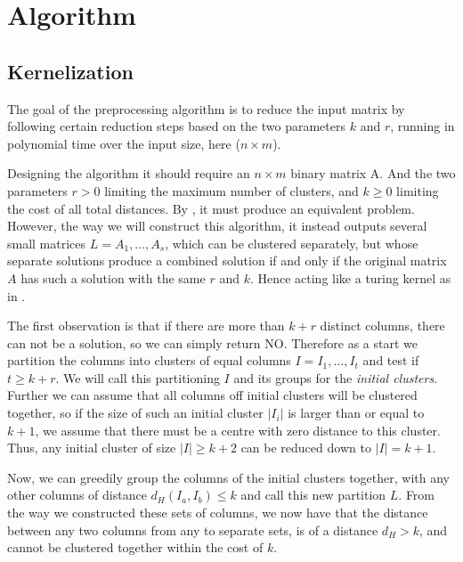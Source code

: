 \documentclass[a4paper]{article}
\begin{document}
%
%

\newpage

\section{Algorithm}
\label{sec:algo}

\subsection{Kernelization}
\label{sec:algo:kernel}
The goal of the preprocessing algorithm is to reduce the input matrix by following certain reduction steps
based on the two parameters $k$ and $r$, running in polynomial time over the input size, here ($n \times m$).

Designing the algorithm it should require an $n \times m$ binary matrix A. And the two parameters $r > 0$ limiting the
maximum number of clusters, and $k \geq 0$ limiting the cost of all total distances. By , it must
produce an equivalent problem. However, the way we will construct this algorithm, it instead outputs several small 
matrices $L={A_1,\dots,A_s}$, which can be clustered separately, but whose separate solutions produce a combined solution if and only if the original 
matrix $A$ has such a solution with the same $r$ and $k$. Hence acting like a turing kernel as in .

The first observation is that if there are more than $k+r$ distinct columns, there can not be a solution, so we can simply return NO.
Therefore as a start we partition the columns into clusters of equal columns $I = {I_1, \dots, I_t}$ and test if $t \ge k+r$.
We will call this partitioning $I$ and its groups for the \textit{initial clusters}. Further we can assume that all columns off initial
clusters will be clustered together, so if the size of such an initial cluster $|I_i|$ is larger than or equal to $k+1$,
we assume that there must be a centre with zero distance to this cluster. Thus, any initial cluster of size $|I| \geq k+2$
can be reduced down to $|I| = k+1$.

Now, we can greedily group the columns of the initial clusters together, with any other columns of distance $d_H(I_a,I_b) \leq k$ and call this new
partition $L$. From the way we constructed these sets of columns, we now have that the distance between any two columns from any to separate
sets, is of a distance $d_H > k$, and cannot be clustered together within the cost of $k$.
\end{document}
